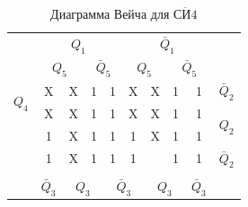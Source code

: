 \documentclass[a4paper,14pt]{article}
\begin{document}
\begin{table}[H]
	\begin{center}
		\caption{\label{tab:SN4_tab} Диаграмма Вейча для $\overline{\text{СИ}4}$ }
		\begin{tabular}{cccccccccc}
			& \multicolumn{4}{c}{$Q_1$} & \multicolumn{4}{c}{$\bar{Q}_1$} &  \\
			& \multicolumn{2}{c}{$Q_5$} & \multicolumn{2}{c}{$\bar{Q}_5$} & \multicolumn{2}{c}{$Q_5$} & \multicolumn{2}{c}{$\bar{Q}_5$} &  \\ \cline{2-9}
			\multicolumn{1}{c|}{\multirow{2}{*}{$Q_4$}} & \multicolumn{1}{c|}{X} & \multicolumn{1}{c|}{X} & \multicolumn{1}{c|}{1} & \multicolumn{1}{c|}{1} & \multicolumn{1}{c|}{X} & \multicolumn{1}{c|}{X} & \multicolumn{1}{c|}{1} & \multicolumn{1}{c|}{1} & $\bar{Q}_2$ \\ \cline{2-9}
			\multicolumn{1}{c|}{} & \multicolumn{1}{c|}{X} & \multicolumn{1}{c|}{X} & \multicolumn{1}{c|}{1} & \multicolumn{1}{c|}{1} & \multicolumn{1}{c|}{X} & \multicolumn{1}{c|}{X} & \multicolumn{1}{c|}{1} & \multicolumn{1}{c|}{1} & \multirow{2}{*}{$Q_2$} \\ \cline{2-9}
			\multicolumn{1}{c|}{\multirow{2}{*}{}} & \multicolumn{1}{c|}{1} & \multicolumn{1}{c|}{X} & \multicolumn{1}{c|}{1} & \multicolumn{1}{c|}{1} & \multicolumn{1}{c|}{1} & \multicolumn{1}{c|}{X} & \multicolumn{1}{c|}{1} & \multicolumn{1}{c|}{1} &  \\ \cline{2-9}
			\multicolumn{1}{c|}{} & \multicolumn{1}{c|}{1} & \multicolumn{1}{c|}{X} & \multicolumn{1}{c|}{1} & \multicolumn{1}{c|}{1} & \multicolumn{1}{c|}{1} & \multicolumn{1}{c|}{} & \multicolumn{1}{c|}{1} & \multicolumn{1}{c|}{1} & $\bar{Q}_2$ \\ \cline{2-9}
			&  & \multicolumn{2}{c}{} & \multicolumn{2}{c}{} & \multicolumn{2}{c}{} &  &  \\
			& $\bar{Q}_3$ & \multicolumn{2}{c}{$Q_3$} & \multicolumn{2}{c}{$\bar{Q}_3$} & \multicolumn{2}{c}{$Q_3$} & $\bar{Q}_3$ & 
		\end{tabular}
	\end{center}
\end{table}

\end{document}
